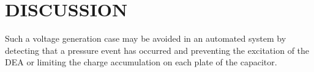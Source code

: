 \section{DISCUSSION}
\label{sec:concs_disc}

Such a voltage generation case may be avoided in an automated system by detecting that a pressure event has occurred and preventing the excitation of the DEA or limiting the charge accumulation on each plate of the capacitor.


